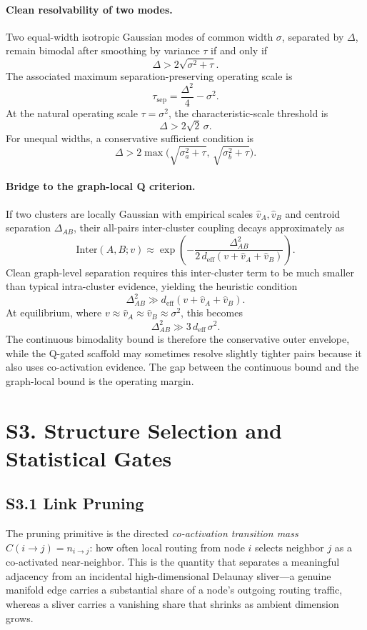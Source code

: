 \documentclass[11pt]{article}
\begin{document}
\paragraph{Clean resolvability of two modes.}
Two equal-width isotropic Gaussian modes of common width $\sigma$, separated by
$\Delta$, remain bimodal after smoothing by variance $\tau$ if and only if
\[
\Delta>2\sqrt{\sigma^2+\tau}.
\]
The associated maximum separation-preserving operating scale is
\[
\tau_{\mathrm{sep}}=\frac{\Delta^2}{4}-\sigma^2.
\]
At the natural operating scale $\tau=\sigma^2$, the characteristic-scale
threshold is
\[
\Delta>2\sqrt{2}\,\sigma.
\]
For unequal widths, a conservative sufficient condition is
\[
\Delta>
2\max\!\bigl(\sqrt{\sigma_a^2+\tau},\,\sqrt{\sigma_b^2+\tau}\bigr).
\]

\paragraph{Bridge to the graph-local Q criterion.}
If two clusters are locally Gaussian with empirical scales $\hat v_A,\hat v_B$
and centroid separation $\Delta_{AB}$, their all-pairs inter-cluster coupling
decays approximately as
\[
\mathrm{Inter}(A,B;v)
\approx
\exp\!\left(
-\frac{\Delta_{AB}^2}
{2\,d_{\mathrm{eff}}(v+\hat v_A+\hat v_B)}
\right).
\]
Clean graph-level separation requires this inter-cluster term to be much
smaller than typical intra-cluster evidence, yielding the heuristic condition
\[
\Delta_{AB}^2\gg d_{\mathrm{eff}}(v+\hat v_A+\hat v_B).
\]
At equilibrium, where $v\approx\hat v_A\approx\hat v_B\approx\sigma^2$, this
becomes
\[
\Delta_{AB}^2\gg 3\,d_{\mathrm{eff}}\,\sigma^2.
\]
The continuous bimodality bound is therefore the conservative outer envelope,
while the Q-gated scaffold may sometimes resolve slightly tighter pairs because
it also uses co-activation evidence. The gap between the continuous bound and
the graph-local bound is the operating margin.

\section*{S3. Structure Selection and Statistical Gates}

\subsection*{S3.1 Link Pruning}
\label{sec:si-link-pruning}
The pruning primitive is the directed \emph{co-activation transition mass} $C(i\!\to\! j)=n_{i\to j}$: how often local routing from node $i$ selects neighbor $j$ as a co-activated near-neighbor. This is the quantity that separates a meaningful adjacency from an incidental high-dimensional Delaunay sliver---a genuine manifold edge carries a substantial share of a node's outgoing routing traffic, whereas a sliver carries a vanishing share that shrinks as ambient dimension grows.
\end{document}
